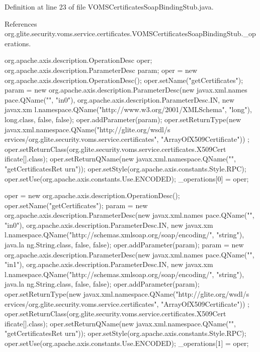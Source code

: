 Definition at line 23 of file VOMSCertificatesSoapBindingStub.java.



References org.glite.security.voms.service.certificates.VOMSCertificatesSoapBindingStub.\_\-operations.


\begin{DoxyCode}
                                             {
        org.apache.axis.description.OperationDesc oper;
        org.apache.axis.description.ParameterDesc param;
        oper = new org.apache.axis.description.OperationDesc();
        oper.setName("getCertificates");
        param = new org.apache.axis.description.ParameterDesc(new javax.xml.names
      pace.QName("", "in0"), org.apache.axis.description.ParameterDesc.IN, new javax.xm
      l.namespace.QName("http://www.w3.org/2001/XMLSchema", "long"), long.class, false,
       false);
        oper.addParameter(param);
        oper.setReturnType(new javax.xml.namespace.QName("http://glite.org/wsdl/s
      ervices/org.glite.security.voms.service.certificates", "ArrayOfX509Certificate"))
      ;
        oper.setReturnClass(org.glite.security.voms.service.certificates.X509Cert
      ificate[].class);
        oper.setReturnQName(new javax.xml.namespace.QName("", "getCertificatesRet
      urn"));
        oper.setStyle(org.apache.axis.constants.Style.RPC);
        oper.setUse(org.apache.axis.constants.Use.ENCODED);
        _operations[0] = oper;

        oper = new org.apache.axis.description.OperationDesc();
        oper.setName("getCertificates");
        param = new org.apache.axis.description.ParameterDesc(new javax.xml.names
      pace.QName("", "in0"), org.apache.axis.description.ParameterDesc.IN, new javax.xm
      l.namespace.QName("http://schemas.xmlsoap.org/soap/encoding/", "string"), java.la
      ng.String.class, false, false);
        oper.addParameter(param);
        param = new org.apache.axis.description.ParameterDesc(new javax.xml.names
      pace.QName("", "in1"), org.apache.axis.description.ParameterDesc.IN, new javax.xm
      l.namespace.QName("http://schemas.xmlsoap.org/soap/encoding/", "string"), java.la
      ng.String.class, false, false);
        oper.addParameter(param);
        oper.setReturnType(new javax.xml.namespace.QName("http://glite.org/wsdl/s
      ervices/org.glite.security.voms.service.certificates", "ArrayOfX509Certificate"))
      ;
        oper.setReturnClass(org.glite.security.voms.service.certificates.X509Cert
      ificate[].class);
        oper.setReturnQName(new javax.xml.namespace.QName("", "getCertificatesRet
      urn"));
        oper.setStyle(org.apache.axis.constants.Style.RPC);
        oper.setUse(org.apache.axis.constants.Use.ENCODED);
        _operations[1] = oper;

}
\end{DoxyCode}
